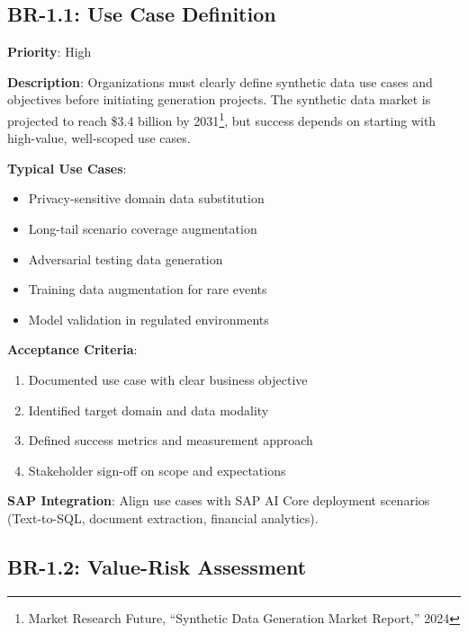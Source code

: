 \subsection{BR-1.1: Use Case Definition}

\begin{tcolorbox}[colback=blue!5,colframe=blue!70,title=BR-1.1: Clear Use Case Definition]
\textbf{Priority}: High

\textbf{Description}: Organizations must clearly define synthetic data use cases
and objectives before initiating generation projects. The synthetic data market
is projected to reach \$3.4 billion by 2031\footnote{Market Research Future,
``Synthetic Data Generation Market Report,'' 2024}, but success depends on
starting with high-value, well-scoped use cases.

\textbf{Typical Use Cases}:
\begin{itemize}
  \item Privacy-sensitive domain data substitution
  \item Long-tail scenario coverage augmentation
  \item Adversarial testing data generation
  \item Training data augmentation for rare events
  \item Model validation in regulated environments
\end{itemize}

\textbf{Acceptance Criteria}:
\begin{enumerate}
  \item Documented use case with clear business objective
  \item Identified target domain and data modality
  \item Defined success metrics and measurement approach
  \item Stakeholder sign-off on scope and expectations
\end{enumerate}

\textbf{SAP Integration}: Align use cases with SAP AI Core deployment scenarios
(Text-to-SQL, document extraction, financial analytics).
\end{tcolorbox}

\subsection{BR-1.2: Value-Risk Assessment}

